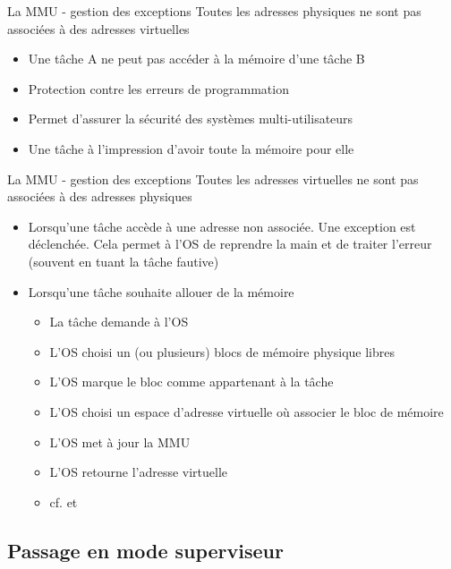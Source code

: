 \begin{frame}{La MMU - gestion des exceptions}
  Toutes les adresses physiques ne sont pas associées à des adresses
  virtuelles
  \begin{itemize}
  \item Une tâche A ne peut pas accéder à la mémoire d'une tâche B
  \item Protection contre les erreurs de programmation
  \item Permet d'assurer la sécurité des systèmes multi-utilisateurs
  \item Une tâche à l'impression d'avoir toute la mémoire pour elle
  \end{itemize}
\end{frame}

\begin{frame}{La MMU - gestion des exceptions}
  Toutes  les  adresses  virtuelles  ne  sont  pas  associées  à  des
  adresses physiques
  \begin{itemize}
  \item  Lorsqu'une tâche  accède à  une adresse  non  associée.  Une
    exception est déclenchée.  Cela permet à l'OS de reprendre la main
    et de traiter l'erreur (souvent en tuant la tâche fautive)
  \item Lorsqu'une tâche souhaite allouer de la mémoire
    \begin{itemize}
    \item  La tâche demande à l'OS
    \item  L'OS choisi  un (ou  plusieurs) blocs  de  mémoire physique
      libres
    \item L'OS marque le bloc comme appartenant à la tâche
    \item  L'OS choisi un  espace d'adresse  virtuelle où  associer le
      bloc de mémoire
    \item L'OS met à jour la MMU
    \item L'OS retourne l'adresse virtuelle
    \item cf.  et 
    \end{itemize}
  \end{itemize}
\end{frame}

\subsection {Passage en mode superviseur}

